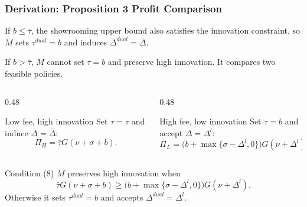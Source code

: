 \begin{frame}
  \frametitle{Derivation: Proposition 3 Profit Comparison}
  \hypertarget{dual_prop3_deriv}{}
  \scriptsize

  If $b\leq\bar{\tau}$, the showrooming upper bound also satisfies the
  innovation constraint, so $M$ sets $\tau^{dual}=b$ and induces
  $\Delta^{dual}=\bar{\Delta}$.

  \vspace{0.05cm}
  If $b>\bar{\tau}$, $M$ cannot set $\tau=b$ and preserve high innovation.
  It compares two feasible policies.

  \begin{columns}[T,onlytextwidth]
    \begin{column}{0.48\textwidth}
      \begin{block}{Low fee, high innovation}
        Set $\tau=\bar{\tau}$ and induce $\Delta=\bar{\Delta}$:
        \[
          \Pi_H
          =
          \bar{\tau}G(\nu+\sigma+b).
        \]
      \end{block}
    \end{column}

    \begin{column}{0.48\textwidth}
      \begin{block}{High fee, low innovation}
        Set $\tau=b$ and accept $\Delta=\Delta^l$:
        \[
          \Pi_L
          =
          \bigl(b+\max\{\sigma-\Delta^l,0\}\bigr)
          G(\nu+\Delta^l).
        \]
      \end{block}
    \end{column}
  \end{columns}

  \begin{alertblock}{Condition (8)}
    $M$ preserves high innovation when
    \[
      \bar{\tau}G(\nu+\sigma+b)
      \geq
      \bigl(b+\max\{\sigma-\Delta^l,0\}\bigr)G(\nu+\Delta^l).
    \]
    Otherwise it sets $\tau^{dual}=b$ and accepts
    $\Delta^{dual}=\Delta^l$.
  \end{alertblock}

  \hyperlink{dual_prop3_src}{}
\end{frame}


